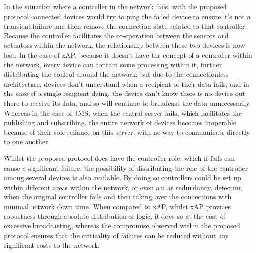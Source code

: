 In the situation where a controller in the network fails, with the proposed protocol connected devices would try to ping the failed device to ensure it's not a transient failure and then remove the connection state related to that controller. Because the controller facilitates the co-operation between the sensors and actuators within the network, the relationship between these two devices is now lost. In the case of xAP, because it doesn't have the concept of a controller within the network, every device can contain some processing within it, further distributing the control around the network; but due to the connectionless architecture, devices don't understand when a recipient of their data fails, and in the case of a single recipient dying, the device can't know there is no device out there to receive its data, and so will continue to broadcast the data unnecessarily. Whereas in the case of JMS, when the central server fails, which facilitates the publishing and subscribing, the entire network of devices becomes inoperable because of their sole reliance on this server, with no way to communicate directly to one another.

Whilst the proposed protocol does have the controller role, which if fails can cause a significant failure, the possibility of distributing the role of the controller among several devices is also available. By doing so controllers could be set up within different areas within the network, or even act as redundancy, detecting when the original controller fails and then taking over the connections with minimal network down time. When compared to xAP, whilst xAP provides robustness through absolute distribution of logic, it does so at the cost of excessive broadcasting; whereas the compromise observed within the proposed protocol ensures that the criticality of failures can be reduced without any significant costs to the network. 



